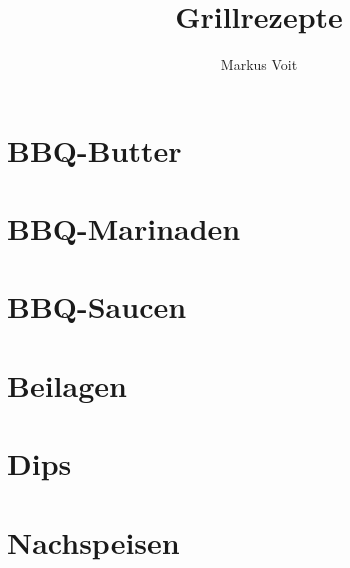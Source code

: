 \documentclass[
  DIV=11,%
  pagesize,%
  fontsize=11pt,%
  paper=a4,%
  numbers=noenddot,
]{scrartcl}
\title{Grillrezepte}
\author{Markus Voit}
\begin{document}
\maketitle
\clearpage

\tableofcontents
\clearpage

\section{BBQ-Butter}
\newpage
\newpage
\newpage
\newpage
\newpage

\section{BBQ-Marinaden}
\newpage
\newpage
\newpage

\section{BBQ-Saucen}
\newpage
\newpage
\newpage
\newpage
\newpage
\newpage
\newpage

\section{Beilagen}
\newpage
\newpage
\newpage

\section{Dips}
\newpage

\section{Nachspeisen}
\newpage
\newpage
\newpage
\newpage
\newpage
\end{document}
